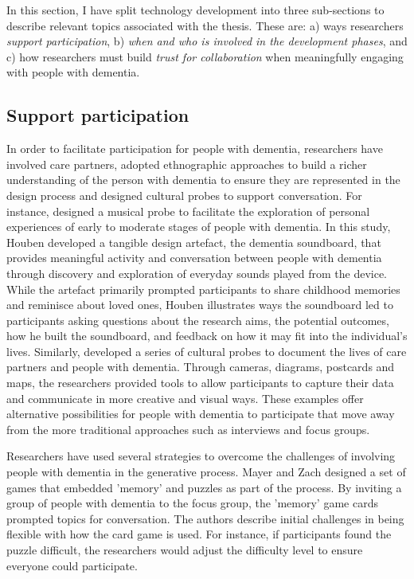 In this section, I have split technology development into three sub-sections to describe relevant topics associated with the thesis. These are: a) ways researchers \textit{support participation}, b) \textit{when and who is involved in the development phases}, and c) how researchers must build \textit{trust for collaboration} when meaningfully engaging with people with dementia.

\subsection{Support participation}
\label{BL:SupportParticipation}
In order to facilitate participation for people with dementia, researchers have involved care partners, adopted ethnographic approaches to build a richer understanding of the person with dementia to ensure they are represented in the design process and designed cultural probes to support conversation. For instance, \cite{houben_foregrounding_2019} designed a musical probe to facilitate the exploration of personal experiences of early to moderate stages of people with dementia. In this study, Houben developed a tangible design artefact, the dementia soundboard, that provides meaningful activity and conversation between people with dementia through discovery and exploration of everyday sounds played from the device. While the artefact primarily prompted participants to share childhood memories and reminisce about loved ones, Houben illustrates ways the soundboard led to participants asking questions about the research aims, the potential outcomes, how he built the soundboard, and feedback on how it may fit into the individual's lives. Similarly, \cite{brown2014using} developed a series of cultural probes to document the lives of care partners and people with dementia. Through cameras, diagrams, postcards and maps, the researchers provided tools to allow participants to capture their data and communicate in more creative and visual ways. These examples offer alternative possibilities for people with dementia to participate that move away from the more traditional approaches such as interviews and focus groups.

Researchers have used several strategies to overcome the challenges of involving people with dementia in the generative process. Mayer and Zach designed a set of games that embedded 'memory' and puzzles as part of the process. By inviting a group of people with dementia to the focus group, the 'memory' game cards prompted topics for conversation. The authors describe initial challenges in being flexible with how the card game is used. For instance, if participants found the puzzle difficult, the researchers would adjust the difficulty level to ensure everyone could participate.

